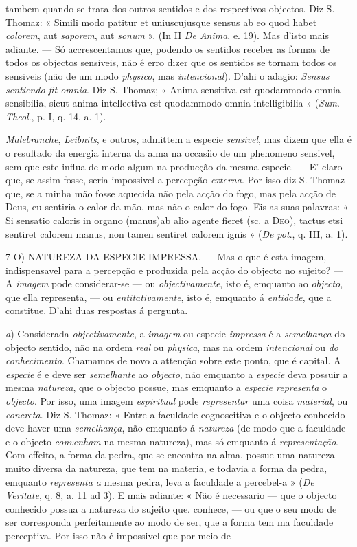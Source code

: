 tambem quando se trata dos outros sentidos e dos respectivos objectos. Diz S. Thomaz: « Simili modo patitur et uniuscujusque sensus ab eo quod habet \emph{colorem}, aut \emph{saporem}, aut \emph{sonum} ». (In II \emph{De Anima}, e. 19). Mas d'isto mais adiante. --- Só accrescentamos que, podendo os sentidos receber as formas de todos os objectos sensiveis, não é erro dizer que os sentidos se tornam todos os sensiveis (não de um modo \emph{physico}, mas \emph{intencional}). D'ahi o adagio: \emph{Sensus sentiendo fit omnia}. Diz S. Thomaz; « Anima sensitiva est quodammodo omnia sensibilia, sicut anima intellectiva est quodammodo omnia intelligibilia » (\emph{Sum}. \emph{Theol}., p. I, q. 14, a. 1).\par \emph{Malebranche}, \emph{Leibnits}, e outros, admittem a especie \emph{sensivel}, mas dizem que ella é o resultado da energia interna da alma na occasiio de um phenomeno sensivel, sem que este influa de modo algum na producção da mesma especie. --- E' claro que, se assim fosse, seria impossivel a percepção \emph{externa}. Por isso diz S. Thomaz que, se a minha mão fosse aquecida não pela acção do fogo, mas pela acção de Deus, eu sentiria o calor da mão, mas não o calor do fogo. Eis as suas palavras: « Si sensatio caloris in organo (manus)ab alio agente fieret (sc. a \textsc{Deo}), tactus etsi sentiret calorem manus, non tamen sentiret calorem ignis » (\emph{De pot}., q. III, a. 1).\par 7 O) \textsc{NATUREZA} DA ESPECIE IMPRESSA. --- Mas o que é esta imagem, indispensavel para a percepção e produzida pela acção do objecto no sujeito? --- A \emph{imagem} pode considerar-se --- ou \emph{objectivamente}, isto é, emquanto ao \emph{objecto}, que ella representa, --- ou \emph{entitativamente}, isto é, emquanto á \emph{entidade}, que a constitue. D'ahi duas respostas á pergunta.\par \emph{a}) Considerada \emph{objectivamente}, a \emph{imagem} ou especie \emph{impressa} é a \emph{semelhança} do objecto sentido, não na ordem \emph{real} ou \emph{physica}, mas na ordem \emph{intencional} ou \emph{do conhecimento}. Chamamos de novo a attenção sobre este ponto, que é capital. A \emph{especie} é e deve ser \emph{semelhante} ao \emph{objecto}, não emquanto a \emph{especie} deva possuir a mesma \emph{natureza}, que o objecto possue, mas emquanto a \emph{especie representa} o \emph{objecto}. Por isso, uma imagem \emph{espiritual} pode \emph{representar} uma coisa \emph{material}, ou \emph{concreta}. Diz S. Thomaz: « Entre a faculdade cognoscitiva e o objecto conhecido deve haver uma \emph{semelhança}, não emquanto á \emph{natureza} (de modo que a faculdade e o objecto \emph{convenham} na mesma natureza), mas só emquanto á \emph{representação}. Com effeito, a forma da pedra, que se encontra na alma, possue uma natureza muito diversa da natureza, que tem na materia, e todavia a forma da pedra, emquanto \emph{representa a} mesma pedra, leva a faculdade a percebel-a » (\emph{De Veritate}, q. 8, a. 11 ad 3). E mais adiante: « Não é necessario --- que o objecto conhecido possua a natureza do sujeito que. conhece, --- ou que o seu modo de ser corresponda perfeitamente ao modo de ser, que a forma tem ma faculdade perceptiva. Por isso não é impossivel que por meio de 